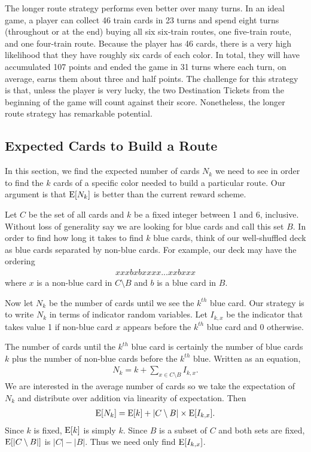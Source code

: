 The longer route strategy performs even better over many turns.
In an ideal game, a player can collect 46 train cards in 23 turns
and spend eight turns (throughout or at the end) buying all six
six-train routes, one five-train route, and one four-train route.
Because the player has 46 cards, there is a very high likelihood that
they have roughly six cards of each color.
In total, they will have accumulated 107 points and ended the game in 31 turns
where each turn, on average, earns them about three and half points.
The challenge for this strategy is that, unless the player is very lucky,
the two Destination Tickets from the beginning of the game will count
against their score.
Nonetheless, the longer route strategy has remarkable potential.

\subsection{Expected Cards to Build a Route}\label{sec:collecting_cards}
In this section, we find the expected number of cards
$N_k$ we need to see in order to find the $k$ cards of a specific color
needed to build a particular route.
Our argument is that $\operatorname{\mathrm{E}}[N_k]$ is better than the
current reward scheme.

Let $C$ be the set of all cards and $k$ be a fixed integer
between 1 and 6, inclusive.
Without loss of generality say we are looking
for blue cards and call this set $B$.
In order to find how long it takes to find $k$ blue cards,
think of our well-shuffled deck as
blue cards separated by non-blue cards.
For example, our deck may have the ordering
\begin{align}
    xxxbxbxxxx...xxbxxx \nonumber
\end{align}
where $x$ is a non-blue card in $C \setminus B$
and $b$ is a blue card in $B$.

Now let $N_k$ be the number of cards until
we see the $k^{th}$ blue card.
Our strategy is to write $N_k$ in terms of
indicator random variables.
Let $I_{k,x}$ be the indicator that takes value 1
if non-blue card $x$ appears before the $k^{th}$ blue card
and 0 otherwise.

The number of cards until the $k^{th}$ blue card
is certainly the number of blue cards $k$
plus the number of non-blue cards before the $k^{th}$ blue.
Written as an equation,
\begin{align}
    N_k = k + \sum_{x \in C \setminus B} I_{k,x}. \nonumber
\end{align}
We are interested in the average number of cards
so we take the expectation of $N_k$ and distribute
over addition via linearity of expectation.
Then
\begin{align} \label{eq:expected_card}
    \operatorname{\mathrm{E}}[N_k] = \operatorname{\mathrm{E}}[k] + |C \setminus B| \times \operatorname{\mathrm{E}}[I_{k,x}].
\end{align}
Since $k$ is fixed, $\operatorname{\mathrm{E}}[k]$ is simply $k$.
Since $B$ is a subset of $C$ and both sets are fixed,
$\operatorname{\mathrm{E}}[|C \setminus B|]$ is $|C| - |B|$.
Thus we need only find $\operatorname{\mathrm{E}}[I_{k,x}]$.


